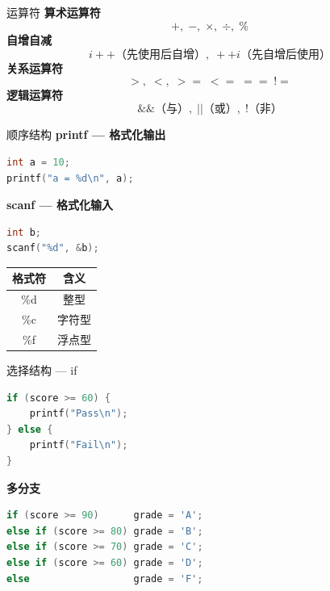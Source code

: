 \documentclass[10pt, aspectratio=169]{beamer}
\begin{document}
\begin{frame}{运算符}
    \textbf{算术运算符}
    \[
    +,\; -,\; \times,\; \div,\; \%
    \]
    \vspace{0.3em}
    \textbf{自增自减}
    \[
    i++ \text{（先使用后自增）},\; ++i \text{（先自增后使用）}
    \]
    \vspace{0.3em}
    \textbf{关系运算符}
    \[
    >,\; <,\; >=\; <=\; ==\; !=
    \]
    \vspace{0.3em}
    \textbf{逻辑运算符}
    \[
    \&\& \text{（与）},\; || \text{（或）},\; ! \text{（非）}
    \]
\end{frame}

\begin{frame}[fragile]{顺序结构}
    \textbf{printf --- 格式化输出}
    \begin{lstlisting}[language=C, basicstyle=\ttfamily\small]
int a = 10;
printf("a = %d\n", a);
    \end{lstlisting}
    \vspace{0.3em}
    \textbf{scanf --- 格式化输入}
    \begin{lstlisting}[language=C, basicstyle=\ttfamily\small]
int b;
scanf("%d", &b);
    \end{lstlisting}
    \vspace{0.3em}
    \begin{tabular}{|c|c|}
        \hline \textbf{格式符} & \textbf{含义} \\ \hline
        \%d & 整型 \\ \hline
        \%c & 字符型 \\ \hline
        \%f & 浮点型 \\ \hline
    \end{tabular}
\end{frame}

\begin{frame}[fragile]{选择结构 --- if}
    \begin{lstlisting}[language=C, basicstyle=\ttfamily\small]
if (score >= 60) {
    printf("Pass\n");
} else {
    printf("Fail\n");
}
    \end{lstlisting}
    \vspace{0.3em}
    \textbf{多分支}
    \begin{lstlisting}[language=C, basicstyle=\ttfamily\small]
if (score >= 90)      grade = 'A';
else if (score >= 80) grade = 'B';
else if (score >= 70) grade = 'C';
else if (score >= 60) grade = 'D';
else                  grade = 'F';
    \end{lstlisting}
\end{frame}
\end{document}
